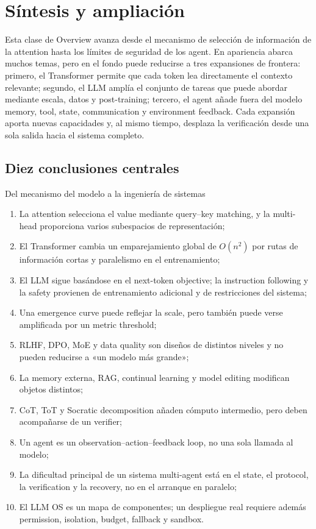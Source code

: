 \section{Síntesis y ampliación}

Esta clase de Overview avanza desde el mecanismo de selección de información de la attention hasta los límites de seguridad de los agent. En apariencia abarca muchos temas, pero en el fondo puede reducirse a tres expansiones de frontera: primero, el Transformer permite que cada token lea directamente el contexto relevante; segundo, el LLM amplía el conjunto de tareas que puede abordar mediante escala, datos y post-training; tercero, el agent añade fuera del modelo memory, tool, state, communication y environment feedback. Cada expansión aporta nuevas capacidades y, al mismo tiempo, desplaza la verificación desde una sola salida hacia el sistema completo.

\subsection{Diez conclusiones centrales}

\begin{importantbox}{Del mecanismo del modelo a la ingeniería de sistemas}
\begin{enumerate}
  \item La attention selecciona el value mediante query--key matching, y la multi-head proporciona varios subespacios de representación;
  \item El Transformer cambia un emparejamiento global de $O(n^2)$ por rutas de información cortas y paralelismo en el entrenamiento;
  \item El LLM sigue basándose en el next-token objective; la instruction following y la safety provienen de entrenamiento adicional y de restricciones del sistema;
  \item Una emergence curve puede reflejar la scale, pero también puede verse amplificada por un metric threshold;
  \item RLHF, DPO, MoE y data quality son diseños de distintos niveles y no pueden reducirse a «un modelo más grande»;
  \item La memory externa, RAG, continual learning y model editing modifican objetos distintos;
  \item CoT, ToT y Socratic decomposition añaden cómputo intermedio, pero deben acompañarse de un verifier;
  \item Un agent es un observation--action--feedback loop, no una sola llamada al modelo;
  \item La dificultad principal de un sistema multi-agent está en el state, el protocol, la verification y la recovery, no en el arranque en paralelo;
  \item El LLM OS es un mapa de componentes; un despliegue real requiere además permission, isolation, budget, fallback y sandbox.
\end{enumerate}
\end{importantbox}

